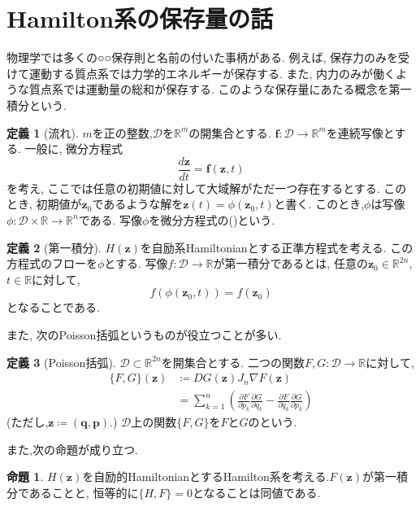 \documentclass{ltjsarticle}
\theoremstyle{definition}
\numberwithin{thm}{section}
\theoremstyle{definition}
\newtheorem{prop}{命題}
\numberwithin{prop}{section}
\theoremstyle{definition}
\newtheorem{dfn}{定義}
\numberwithin{dfn}{section}
\numberwithin{equation}{section}
\begin{document}
\section{Hamilton系の保存量の話}
物理学では多くの○○保存則と名前の付いた事柄がある. 例えば, 保存力のみを受けて運動する質点系では力学的エネルギーが保存する. また, 内力のみが働くような質点系では運動量の総和が保存する. このような保存量にあたる概念を第一積分という.
\begin{dfn}[流れ]
    $m$を正の整数,$\mathcal{D}$を$\mathbb{R}^m$の開集合とする. $\bm{f}:\mathcal{D}\to \mathbb{R}^m$を連続写像とする. 
    一般に, 微分方程式
    \begin{equation}
        \frac{d\bm{z}}{dt}=\bm{f}(\bm{z},t)
    \end{equation}
    を考え, ここでは任意の初期値に対して大域解がただ一つ存在するとする. このとき, 初期値が$\bm{z}_0$であるような解を$\bm{z}(t)=\phi(\bm{z}_0,t)$と書く. このとき,$\phi$は写像$\phi:\mathcal{D}\times \mathbb{R}\to \mathbb{R}^n$である. 写像$\phi$を微分方程式の()という.
\end{dfn}
\begin{dfn}[第一積分]
    $H(\bm{z})$を自励系Hamiltonianとする正準方程式を考える. この方程式のフローを$\phi$とする. 写像$f:\mathcal{D}\to \mathbb{R}$が第一積分であるとは, 任意の$\bm{z}_0\in \mathbb{R}^{2n}$,$t\in \mathbb{R}$に対して,
    \begin{equation}
        f(\phi(\bm{z}_0,t))=f(\bm{z}_0)
    \end{equation}
    となることである.
\end{dfn}
また, 次のPoisson括弧というものが役立つことが多い.
\begin{dfn}[Poisson括弧]
    $\mathcal{D}\subset\mathbb{R}^{2n}$を開集合とする. 二つの関数$F,G\colon\mathcal{D}\to\mathbb{R}$に対して,
    \begin{equation}
    \begin{aligned}
        \{F,G \}(\bm{z})&\coloneq DG(\bm{z})J_n\nabla F(\bm{z})\\
        &=\sum_{k=1}^{n}{\left(\frac{\partial F}{\partial p_k}\frac{\partial G}{\partial q_k}-  \frac{\partial F}{\partial q_k}\frac{\partial G}{\partial p_k}\right)}
    \end{aligned}
    \end{equation}
    (ただし,$\bm{z}\coloneq(\bm{q},\bm{p})$.) $\mathcal{D}$上の関数$\{F,G\}$を$F$と$G$のという.
\end{dfn}
また,次の命題が成り立つ.
\begin{prop}
    $H(\bm{z})$を自励的HamiltonianとするHamilton系を考える.$F(\bm{z})$が第一積分であることと, 恒等的に$\{H,F\}=0$となることは同値である.
\end{prop}
\end{document}
